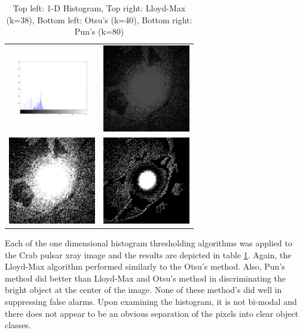 \documentclass[journal]{IEEEtran}
\begin{document}
\begin{table}[!h]
\centering
\begin{tabular}{cc}
\includegraphics[width=1.5in]{../results/crabpulsar-xray_hist.png} &
\includegraphics[width=1.5in]{../results/crabpulsar-xray_lloydmax.png} \\
\newline
\includegraphics[width=1.5in]{../results/crabpulsar-xray_otsu.png} &
\includegraphics[width=1.5in]{../results/crabpulsar-xray_pun.png} \\
\end{tabular}
\caption{Top left: 1-D Histogram, Top right: Lloyd-Max (k=38), Bottom left: Otsu's (k=40), Bottom right: Pun's (k=80)}
\label{tab:xrayTable1}
\end{table}

\par Each of the one dimensional histogram thresholding algorithms was applied to the Crab pulsar xray image and the results are depicted in table \ref{tab:xrayTable1}. Again, the Lloyd-Max algorithm performed similarly to the Otsu's method. Also, Pun's method did better than Lloyd-Max and Otsu's method in discriminating the bright object at the center of the image. None of these method's did well in suppressing false alarms. Upon examining the histogram, it is not bi-modal and there does not appear to be an obvious separation of the pixels into clear object classes.
\end{document}
